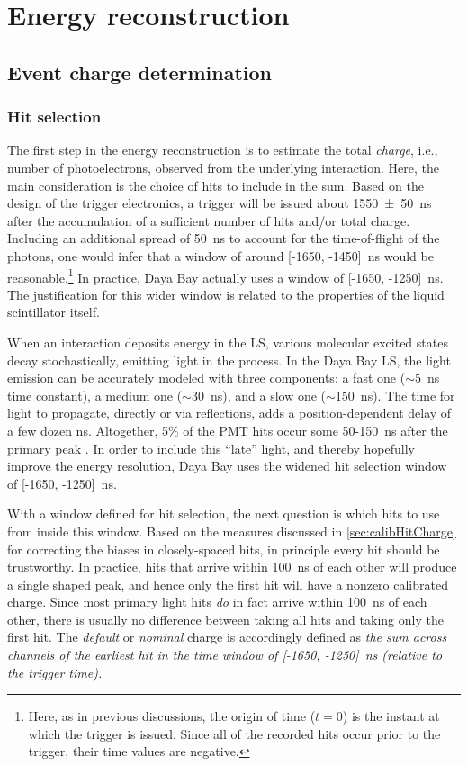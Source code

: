 \documentclass[../thesis.tex]{subfiles}
\begin{document}
\section{Energy reconstruction}
\label{sec:reconEnergy}

\subsection{Event charge determination}
\label{sec:reconEnergyCharge}

\subsubsection{Hit selection}
\label{sec:reconHitSelection}

The first step in the energy reconstruction is to estimate the total \emph{charge}, i.e., number of photoelectrons, observed from the underlying interaction. Here, the main consideration is the choice of hits to include in the sum. Based on the design of the trigger electronics, a trigger will be issued about \SI{1550 \pm 50}{ns} after the accumulation of a sufficient number of hits and/or total charge. Including an additional spread of 50~ns to account for the time-of-flight of the photons, one would infer that a window of around [-1650, -1450]~ns would be reasonable.\footnote{Here, as in previous discussions, the origin of time ($t = 0$) is the instant at which the trigger is issued. Since all of the recorded hits occur prior to the trigger, their time values are negative.} In practice, Daya Bay actually uses a window of [-1650, -1250]~ns. The justification for this wider window is related to the properties of the liquid scintillator itself.

When an interaction deposits energy in the LS, various molecular excited states decay stochastically, emitting light in the process. In the Daya Bay LS, the light emission can be accurately modeled with three components: a fast one ($\sim$5~ns time constant), a medium one ($\sim$30~ns), and a slow one ($\sim$150~ns). The time for light to propagate, directly or via reflections, adds a position-dependent delay of a few dozen ns. Altogether, 5\% of the PMT hits occur some 50-150~ns after the primary peak \cite{peakCharge}. In order to include this ``late'' light, and thereby hopefully improve the energy resolution, Daya Bay uses the widened hit selection window of [-1650, -1250]~ns.

With a window defined for hit selection, the next question is which hits to use from inside this window. Based on the measures discussed in \autoref{sec:calibHitCharge} for correcting the biases in closely-spaced hits, in principle every hit should be trustworthy. In practice, hits that arrive within 100~ns of each other will produce a single shaped peak, and hence only the first hit will have a nonzero calibrated charge. Since most primary light hits \emph{do} in fact arrive within 100~ns of each other, there is usually no difference between taking all hits and taking only the first hit. The \emph{default} or \emph{nominal} charge is accordingly defined as \emph{the sum across channels of the earliest hit in the time window of [-1650, -1250]~ns (relative to the trigger time).}
\end{document}

